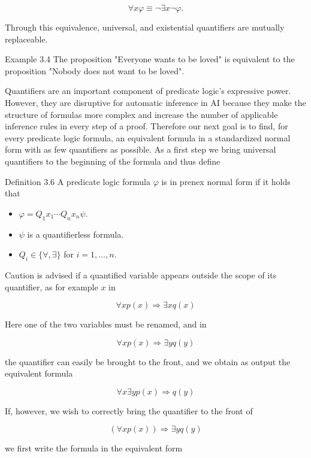 \documentclass[10pt]{article}
\begin{document}
$$
\forall x \varphi \equiv \neg \exists x \neg \varphi .
$$

Through this equivalence, universal, and existential quantifiers are mutually replaceable.


Example 3.4 The proposition "Everyone wants to be loved" is equivalent to the proposition "Nobody does not want to be loved".

Quantifiers are an important component of predicate logic's expressive power. However, they are disruptive for automatic inference in AI because they make the structure of formulas more complex and increase the number of applicable inference rules in every step of a proof. Therefore our next goal is to find, for every predicate logic formula, an equivalent formula in a standardized normal form with as few quantifiers as possible. As a first step we bring universal quantifiers to the beginning of the formula and thus define

Definition 3.6 A predicate logic formula $\varphi$ is in prenex normal form if it holds that

\begin{itemize}
  \item $\varphi=Q_{1} x_{1} \cdots Q_{n} x_{n} \psi$.
  \item $\psi$ is a quantifierless formula.
  \item $Q_{i} \in\{\forall, \exists\}$ for $i=1, \ldots, n$.
\end{itemize}

Caution is advised if a quantified variable appears outside the scope of its quantifier, as for example $x$ in

$$
\forall x p(x) \Rightarrow \exists x q(x)
$$

Here one of the two variables must be renamed, and in

$$
\forall x p(x) \Rightarrow \exists y q(y)
$$

the quantifier can easily be brought to the front, and we obtain as output the equivalent formula

$$
\forall x \exists y p(x) \Rightarrow q(y)
$$

If, however, we wish to correctly bring the quantifier to the front of


\begin{equation*}
(\forall x p(x)) \Rightarrow \exists y q(y) \tag{3.4}
\end{equation*}


we first write the formula in the equivalent form
\end{document}
